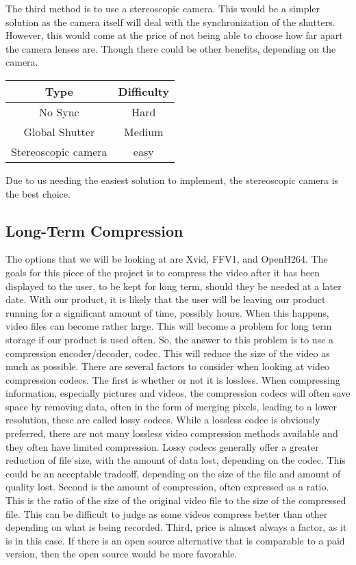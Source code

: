 \documentclass[letterpaper,10pt,onecolumn,draftclsnofoot]{IEEEtran}
\begin{document}
The third method is to use a stereoscopic camera.
This would be a simpler solution as the camera itself will deal with the synchronization of the shutters.
However, this would come at the price of not being able to choose how far apart the camera lenses are.
Though there could be other benefits, depending on the camera.

\begin{center}
	\begin{tabular}{|c|c|}
		\hline
		\textbf{Type} & \textbf{Difficulty} \\
		\hline
		No Sync & Hard \\
		\hline
		Global Shutter & Medium\\
		\hline
		Stereoscopic camera & easy \\
		\hline
		
	\end{tabular}
\end{center}


Due to us needing the easiest solution to implement, the stereoscopic camera is the best choice.


\newpage
\subsection{Long-Term Compression} %

The options that we will be looking at are Xvid, FFV1, and OpenH264.
The goals for this piece of the project is to compress the video after it has been displayed to the user, to be kept for long term, should they be needed at a later date.
With our product, it is likely that the user will be leaving our product running for a significant amount of time, possibly hours.
When this happens, video files can become rather large.
This will become a problem for long term storage if our product is used often.
So, the answer to this problem is to use a compression encoder/decoder, codec.
This will reduce the size of the video as much as possible.
There are several factors to consider when looking at video compression codecs.
The first is whether or not it is lossless.
When compressing information, especially pictures and videos, the compression codecs will often save space by removing data, often in the form of merging pixels, leading to a lower resolution, these are called lossy codecs.
While a lossless codec is obviously preferred, there are not many lossless video compression methods available and they often have limited compression.
Lossy codecs generally offer a greater reduction of file size, with the amount of data lost, depending on the codec.
This could be an acceptable tradeoff, depending on the size of the file and amount of quality lost.
Second is the amount of compression, often expressed as a ratio.
This is the ratio of the size of the original video file to the size of the compressed file.
This can be difficult to judge as some videos compress better than other depending on what is being recorded.
Third, price is almost always a factor, as it is in this case.
If there is an open source alternative that is comparable to a paid version, then the open source would be more favorable.
\end{document}
